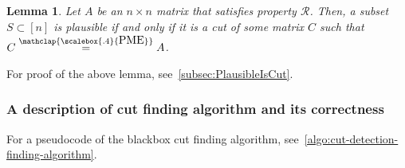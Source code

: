 \documentclass[11pt,letterpaper]{article}
\newcommand{\comp}[1]{\overline{#1}}
\newcommand{\sgc}[1]{\textcolor{orange}{\guillemotleft \textbf{Sumanta:} #1\guillemotright}}
\newcommand{\rc}[1]{\textcolor{blue}{\guillemotleft \textbf{Roshan:} #1\guillemotright}}
\newcommand{\F}{\mathbb{F}}
\newtheorem{lemma}{Lemma}[section]
\DeclareMathOperator{\calP}{\mathcal{P}}
\newcommand{\PME}{\stackrel{\mathclap{\scalebox{.4}{\mbox{PME}}}}{=}}
\newcommand{\prop}{\mathcal{R}}
\newcommand{\submatrixfamily}[1]{\mathcal{F}_{#1}}
\begin{document}
{{{\begin{lemma}
\label{lem:CutChecking}
Let $A$ be an $n\times n$ matrix that satisfies property $\prop$. Then, a subset $S\subset [n]$ is plausible if and only if it is a cut of some matrix $C$ such that $C\PME A$.
\end{lemma}
For proof of the above lemma, see~\cref{subsec:PlausibleIsCut}. 

\subsubsection{A description of cut finding algorithm and its correctness} 
\label{subsec:DesCutFind}
For a pseudocode of the blackbox cut finding algorithm, see~\cref{algo:cut-detection-finding-algorithm}.


}}}
\end{document}
